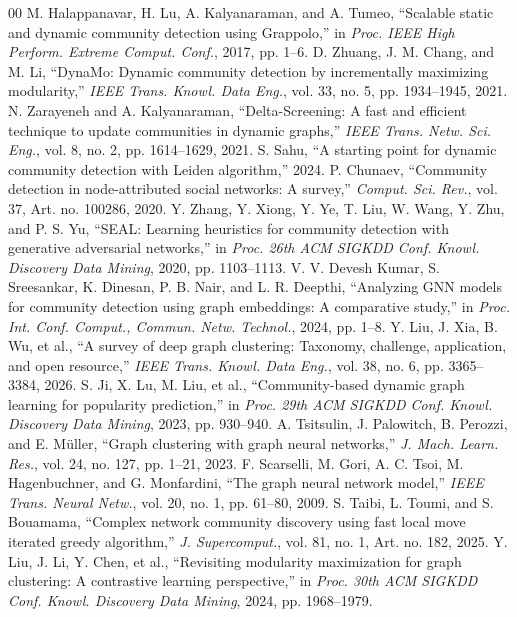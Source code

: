\documentclass[conference]{IEEEtran}
\theoremstyle{definition}
\begin{document}
\begin{thebibliography}{00}
    M. Halappanavar, H. Lu, A. Kalyanaraman, and A. Tumeo, ``Scalable static and dynamic community detection using Grappolo,'' in \textit{Proc. IEEE High Perform. Extreme Comput. Conf.}, 2017, pp. 1--6.
    D. Zhuang, J. M. Chang, and M. Li, ``DynaMo: Dynamic community detection by incrementally maximizing modularity,'' \textit{IEEE Trans. Knowl. Data Eng.}, vol. 33, no. 5, pp. 1934--1945, 2021.
    N. Zarayeneh and A. Kalyanaraman, ``Delta-Screening: A fast and efficient technique to update communities in dynamic graphs,'' \textit{IEEE Trans. Netw. Sci. Eng.}, vol. 8, no. 2, pp. 1614--1629, 2021.
    S. Sahu, ``A starting point for dynamic community detection with Leiden algorithm,'' 2024.
    P. Chunaev, ``Community detection in node-attributed social networks: A survey,'' \textit{Comput. Sci. Rev.}, vol. 37, Art. no. 100286, 2020.
    Y. Zhang, Y. Xiong, Y. Ye, T. Liu, W. Wang, Y. Zhu, and P. S. Yu, ``SEAL: Learning heuristics for community detection with generative adversarial networks,'' in \textit{Proc. 26th ACM SIGKDD Conf. Knowl. Discovery Data Mining}, 2020, pp. 1103--1113.
    V. V. Devesh Kumar, S. Sreesankar, K. Dinesan, P. B. Nair, and L. R. Deepthi, ``Analyzing GNN models for community detection using graph embeddings: A comparative study,'' in \textit{Proc. Int. Conf. Comput., Commun. Netw. Technol.}, 2024, pp. 1--8.
    Y. Liu, J. Xia, B. Wu, et al., ``A survey of deep graph clustering: Taxonomy, challenge, application, and open resource,'' \textit{IEEE Trans. Knowl. Data Eng.}, vol. 38, no. 6, pp. 3365--3384, 2026.
    S. Ji, X. Lu, M. Liu, et al., ``Community-based dynamic graph learning for popularity prediction,'' in \textit{Proc. 29th ACM SIGKDD Conf. Knowl. Discovery Data Mining}, 2023, pp. 930--940.
    A. Tsitsulin, J. Palowitch, B. Perozzi, and E. M{\"u}ller, ``Graph clustering with graph neural networks,'' \textit{J. Mach. Learn. Res.}, vol. 24, no. 127, pp. 1--21, 2023.
    F. Scarselli, M. Gori, A. C. Tsoi, M. Hagenbuchner, and G. Monfardini, ``The graph neural network model,'' \textit{IEEE Trans. Neural Netw.}, vol. 20, no. 1, pp. 61--80, 2009.
    S. Taibi, L. Toumi, and S. Bouamama, ``Complex network community discovery using fast local move iterated greedy algorithm,'' \textit{J. Supercomput.}, vol. 81, no. 1, Art. no. 182, 2025.
    Y. Liu, J. Li, Y. Chen, et al., ``Revisiting modularity maximization for graph clustering: A contrastive learning perspective,'' in \textit{Proc. 30th ACM SIGKDD Conf. Knowl. Discovery Data Mining}, 2024, pp. 1968--1979.

\end{thebibliography}
\end{document}
